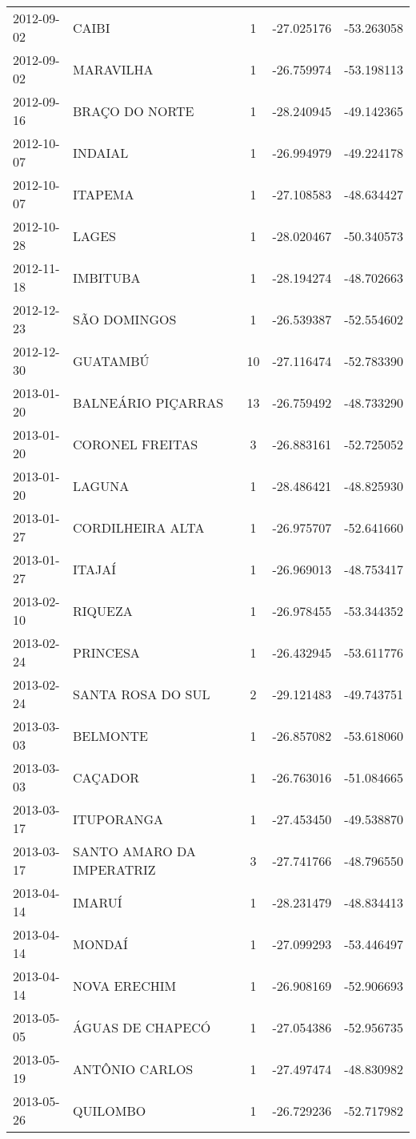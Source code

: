 \documentclass[
	12pt,				%
	openright,			%
	oneside,			%
	a4paper,			%
	english,			%
	french,				%
	spanish,			%
	brazil				%
	dvipsnames, table]{abntex2}
\begin{document}
\begin{longtable}[htbp]{llcrr}
2012-09-02 & CAIBI & 1 & -27.025176 & -53.263058 \\
2012-09-02 & MARAVILHA & 1 & -26.759974 & -53.198113 \\
2012-09-16 & BRAÇO DO NORTE & 1 & -28.240945 & -49.142365 \\
2012-10-07 & INDAIAL & 1 & -26.994979 & -49.224178 \\
2012-10-07 & ITAPEMA & 1 & -27.108583 & -48.634427 \\
2012-10-28 & LAGES & 1 & -28.020467 & -50.340573 \\
2012-11-18 & IMBITUBA & 1 & -28.194274 & -48.702663 \\
2012-12-23 & SÃO DOMINGOS & 1 & -26.539387 & -52.554602 \\
2012-12-30 & GUATAMBÚ & 10 & -27.116474 & -52.783390 \\
2013-01-20 & BALNEÁRIO PIÇARRAS & 13 & -26.759492 & -48.733290 \\
2013-01-20 & CORONEL FREITAS & 3 & -26.883161 & -52.725052 \\
2013-01-20 & LAGUNA & 1 & -28.486421 & -48.825930 \\
2013-01-27 & CORDILHEIRA ALTA & 1 & -26.975707 & -52.641660 \\
2013-01-27 & ITAJAÍ & 1 & -26.969013 & -48.753417 \\
2013-02-10 & RIQUEZA & 1 & -26.978455 & -53.344352 \\
2013-02-24 & PRINCESA & 1 & -26.432945 & -53.611776 \\
2013-02-24 & SANTA ROSA DO SUL & 2 & -29.121483 & -49.743751 \\
2013-03-03 & BELMONTE & 1 & -26.857082 & -53.618060 \\
2013-03-03 & CAÇADOR & 1 & -26.763016 & -51.084665 \\
2013-03-17 & ITUPORANGA & 1 & -27.453450 & -49.538870 \\
2013-03-17 & SANTO AMARO DA IMPERATRIZ & 3 & -27.741766 & -48.796550 \\
2013-04-14 & IMARUÍ & 1 & -28.231479 & -48.834413 \\
2013-04-14 & MONDAÍ & 1 & -27.099293 & -53.446497 \\
2013-04-14 & NOVA ERECHIM & 1 & -26.908169 & -52.906693 \\
2013-05-05 & ÁGUAS DE CHAPECÓ & 1 & -27.054386 & -52.956735 \\
2013-05-19 & ANTÔNIO CARLOS & 1 & -27.497474 & -48.830982 \\
2013-05-26 & QUILOMBO & 1 & -26.729236 & -52.717982 \\

\end{longtable}
\end{document}
